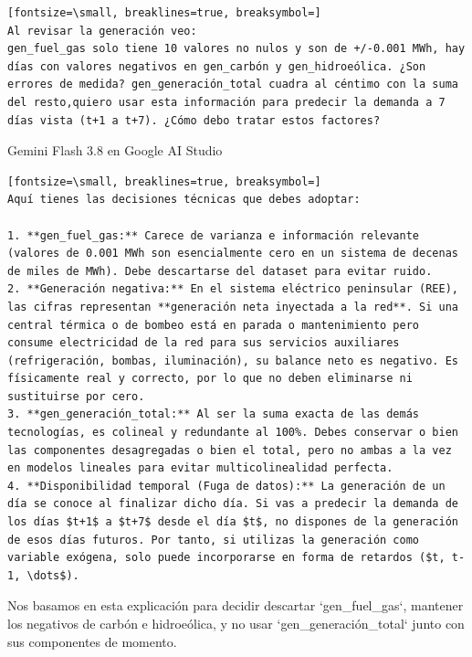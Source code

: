 \documentclass[12pt,a4paper,oneside]{book}
\begin{document}
\begin{iaprompt}
\begin{Verbatim}[fontsize=\small, breaklines=true, breaksymbol=]
Al revisar la generación veo:
gen_fuel_gas solo tiene 10 valores no nulos y son de +/-0.001 MWh, hay días con valores negativos en gen_carbón y gen_hidroeólica. ¿Son errores de medida? gen_generación_total cuadra al céntimo con la suma del resto,quiero usar esta información para predecir la demanda a 7 días vista (t+1 a t+7). ¿Cómo debo tratar estos factores?
\end{Verbatim}
\end{iaprompt}
\begin{iaresp}{Gemini Flash 3.8 en Google AI Studio}
\begin{Verbatim}[fontsize=\small, breaklines=true, breaksymbol=]
Aquí tienes las decisiones técnicas que debes adoptar:

1. **gen_fuel_gas:** Carece de varianza e información relevante (valores de 0.001 MWh son esencialmente cero en un sistema de decenas de miles de MWh). Debe descartarse del dataset para evitar ruido.
2. **Generación negativa:** En el sistema eléctrico peninsular (REE), las cifras representan **generación neta inyectada a la red**. Si una central térmica o de bombeo está en parada o mantenimiento pero consume electricidad de la red para sus servicios auxiliares (refrigeración, bombas, iluminación), su balance neto es negativo. Es físicamente real y correcto, por lo que no deben eliminarse ni sustituirse por cero.
3. **gen_generación_total:** Al ser la suma exacta de las demás tecnologías, es colineal y redundante al 100%. Debes conservar o bien las componentes desagregadas o bien el total, pero no ambas a la vez en modelos lineales para evitar multicolinealidad perfecta.
4. **Disponibilidad temporal (Fuga de datos):** La generación de un día se conoce al finalizar dicho día. Si vas a predecir la demanda de los días $t+1$ a $t+7$ desde el día $t$, no dispones de la generación de esos días futuros. Por tanto, si utilizas la generación como variable exógena, solo puede incorporarse en forma de retardos ($t, t-1, \dots$).
\end{Verbatim}
\end{iaresp}
\begin{iaanalisis}
Nos basamos en esta explicación para decidir descartar `gen_fuel_gas`, mantener los negativos de carbón e hidroeólica, y no usar `gen_generación_total` junto con sus componentes de momento.
\end{iaanalisis}
\end{document}
